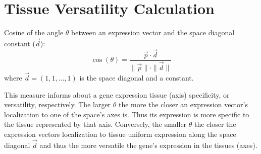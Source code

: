 \section{Tissue Versatility Calculation}
    Cosine of the angle $\theta$ between an expression vector and the space
    diagonal constant ($\vec{d}$):
    \[
        \cos(\theta) = \frac{\vec{p} \cdot \vec{d}}{\|\vec{p}\| \cdot \|\vec{d}\|}
    \]
    where \( \vec{d} = (1, 1, \dots, 1) \) is the space diagonal and a constant.

    This measure informs about a gene expression tissue (axis) specificity, or
    versatility, respectively. The larger $\theta$ the more the closer an
    expression vector's localization to one of the space's axes is. Thus its
    expression is more specific to the tissue represented by that axis. Conversely,
    the smaller $\theta$ the closer the expression vectors localization to tissue
    uniform expression along the space diagonal $\vec{d}$ and thus the more
    versatile the gene's expression in the tissues (axes).